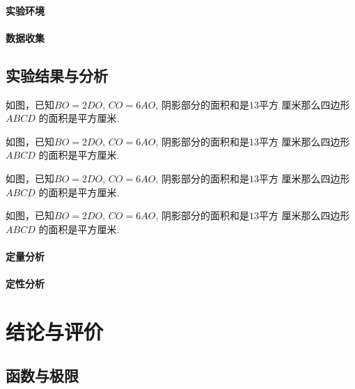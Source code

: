 \documentclass{USTBBook}
\begin{document}
\subsection{实验环境}
\zhlipsum[12]

\subsection{数据收集}
\zhlipsum[13]

\chapter{实验结果与分析}
\zhlipsum[14]


\begin{question*}
  如图，已知$BO=2DO$, $CO=6AO$, 阴影部分的面积和是$13$平方
  厘米那么四边形 $ABCD$ 的面积是\fillin[]平方厘米.
\end{question*}

\begin{question*}
  如图，已知$BO=2DO$, $CO=6AO$, 阴影部分的面积和是$13$平方
  厘米那么四边形 $ABCD$ 的面积是\fillin[]平方厘米.
\end{question*}

\begin{question*}
  如图，已知$BO=2DO$, $CO=6AO$, 阴影部分的面积和是$13$平方
  厘米那么四边形 $ABCD$ 的面积是\fillin[]平方厘米.
\end{question*}

\begin{question*}
  如图，已知$BO=2DO$, $CO=6AO$, 阴影部分的面积和是$13$平方
  厘米那么四边形 $ABCD$ 的面积是\fillin[]平方厘米.
\end{question*}

\subsection{定量分析}

\zhlipsum[16]

\subsection{定性分析}

\zhlipsum[17]

\part{结论与评价}


\chapter{函数与极限}\label{part2:cha:1}


\backmatter
\makeBackCover
\end{document}
